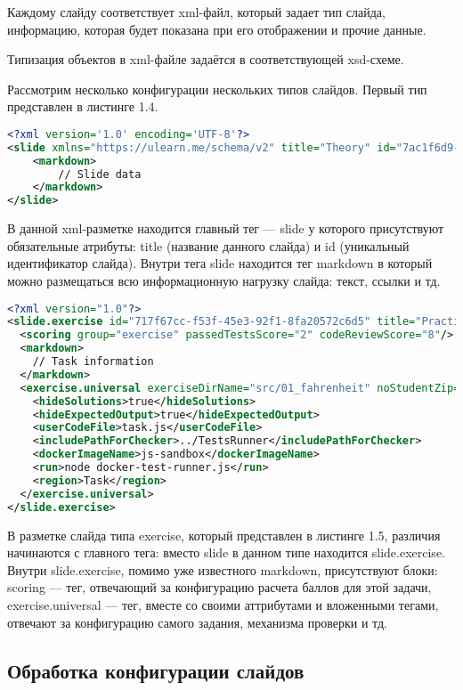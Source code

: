 Каждому слайду соответствует xml-файл, который задает тип слайда, информацию, которая будет показана при его отображении и прочие данные. 

Типизация объектов в xml-файле задаётся в соответствующей xsd-схеме.

Рассмотрим несколько конфигурации нескольких типов слайдов.
Первый тип представлен в листинге 1.4.

\begin{lstlisting}[caption={Пример xml-файла lesson-слайда}, language={XML}]
<?xml version='1.0' encoding='UTF-8'?>
<slide xmlns="https://ulearn.me/schema/v2" title="Theory" id="7ac1f6d9-41d6-4309-8eda-8786ccc3f990">
    <markdown>
        // Slide data
    </markdown>
</slide>
\end{lstlisting}

В данной xml-разметке находится главный тег — slide у которого присутствуют обязательные атрибуты: title (название данного слайда) и id (уникальный идентификатор слайда). Внутри тега slide находится тег markdown в который можно размещаться всю информационную нагрузку слайда: текст, ссылки и тд.
\begin{lstlisting}[caption={Пример xml-файла exercise-слайда}, language={XML}]
<?xml version="1.0"?>
<slide.exercise id="717f67cc-f53f-45e3-92f1-8fa20572c6d5" title="Practice" xmlns="https://ulearn.me/schema/v2">
  <scoring group="exercise" passedTestsScore="2" codeReviewScore="8"/>
  <markdown>
    // Task information
  </markdown>
  <exercise.universal exerciseDirName="src/01_fahrenheit" noStudentZip="true">
    <hideSolutions>true</hideSolutions>
    <hideExpectedOutput>true</hideExpectedOutput>
    <userCodeFile>task.js</userCodeFile>
    <includePathForChecker>../TestsRunner</includePathForChecker>
    <dockerImageName>js-sandbox</dockerImageName>
    <run>node docker-test-runner.js</run>
    <region>Task</region>
  </exercise.universal>
</slide.exercise>
\end{lstlisting}

В разметке слайда типа exercise, который представлен в листинге 1.5, различия начинаются с главного тега: вместо slide в данном типе находится slide.exercise. \\ Внутри slide.exercise, помимо уже известного markdown, присутствуют блоки: scoring — тег, отвечающий за конфигурацию расчета баллов для этой задачи, exercise.universal — тег, вместе со своими аттрибутами и вложенными тегами, отвечают за конфигурацию самого задания, механизма проверки и тд.

\subsection{Обработка конфигурации слайдов}

